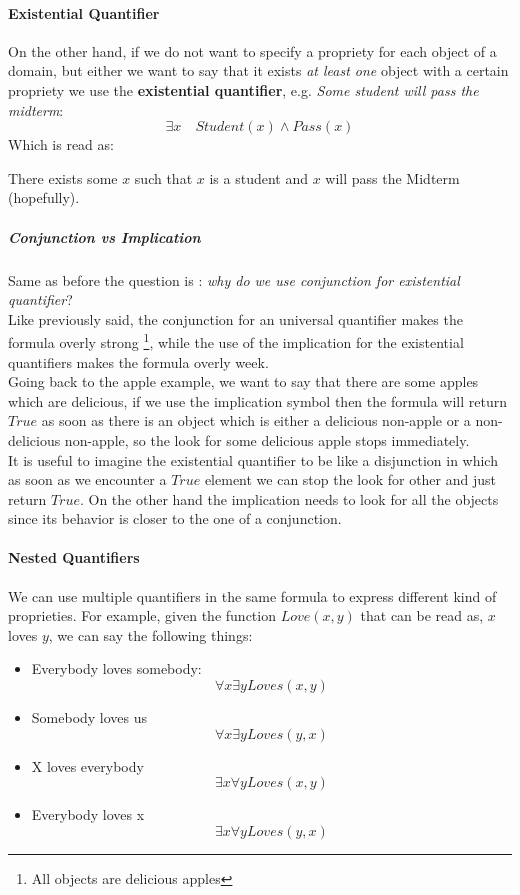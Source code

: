 \documentclass[10pt,a4paper]{article}
\begin{document}
\paragraph{Existential Quantifier}
On the other hand, if we do not want to specify a propriety for each object of a domain, but either we want to say that it exists \textit{at least one} object with a certain propriety we use the \textbf{existential quantifier}, e.g. \textit{Some student will pass the midterm}:
\[\exists x\quad Student(x) \wedge Pass(x)\]
Which is read as:
\begin{center}
There exists some $x$ such that $x$ is a student and $x$ will pass the Midterm (hopefully).
\end{center} 


\subparagraph{Conjunction vs Implication}
Same as before the question is : \textit{why do we use conjunction for existential quantifier}?\\
Like previously said, the conjunction for an universal quantifier makes the formula overly strong \footnote{All objects are delicious apples}, while the use of the implication for the existential quantifiers makes the formula overly week.\\
Going back to the apple example, we want to say that there are some apples which are delicious, if we use the implication symbol then the formula will return $True$ as soon as there is an object which is either a delicious non-apple or a non-delicious non-apple, so the look for some delicious apple stops immediately.\\
It is useful to imagine the existential quantifier to be like a disjunction in which as soon as we encounter a $True$ element we can stop the look for other and just return $True$.
On the other hand the implication needs to look for all the objects since its behavior is closer to the one of a conjunction.

\paragraph{Nested Quantifiers}
We can use multiple quantifiers in the same formula to express different kind of proprieties. For example, given the function $Love(x,y)$ that can be read as, $x$ loves $y$, we can say the following things:
\begin{itemize}
\item Everybody loves somebody:
\[\forall x \exists y Loves(x,y)\]
\item Somebody loves us
\[\forall x \exists y Loves(y,x)\]
\item X loves everybody
\[\exists x \forall y Loves(x,y)\]
\item Everybody loves x
\[\exists x \forall y Loves(y,x)\]
\end{itemize}
\end{document}
